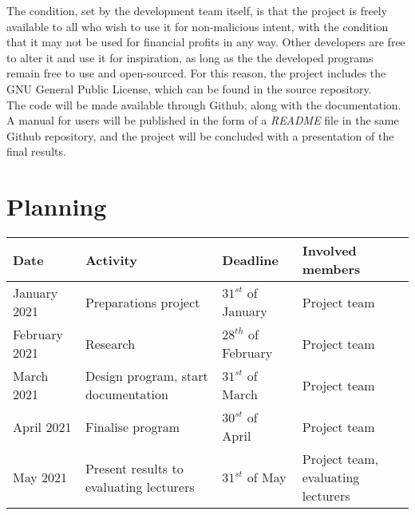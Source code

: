 \documentclass[a4paper,12pt]{article}
\begin{document}
The condition, set by the development team itself, is that the project is freely available to all who wish to use it for non-malicious intent, with the condition that it may not be used for financial profits in any way. Other developers are free to alter it and use it for inspiration, as long as the the developed programs remain free to use and open-sourced. For this reason, the project includes the GNU General Public License, which can be found in the source repository.\\

The code will be made available through Github, along with the documentation. A manual for users will be published in the form of a \textit{README} file in the same Github repository, and the project will be concluded with a presentation of the final results.

\section{Planning}

\begin{center}
  \begin{tabular}{||m{1.5cm} || m{4cm} || m{3cm} || m{3.5cm}||} 
    \hline
    Date & Activity & Deadline & Involved members \\ [0.5ex] 
    \hline\hline
    January 2021 & Preparations project & $31^{st}$ of January & Project team \\ 
    \hline
    February 2021 & Research & $28^{th}$ of February & Project team \\
    \hline
    March 2021 & Design program, start documentation & $31^{st}$ of March & Project team \\
    \hline
    April 2021 & Finalise program & $30^{st}$ of April & Project team \\
    \hline
    May 2021 & Present results to evaluating lecturers & $31^{st}$ of May & Project team, evaluating lecturers \\ [1ex] 
    \hline
  \end{tabular}
\end{center}
\end{document}
